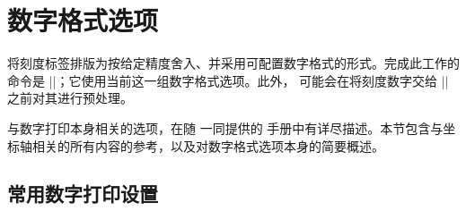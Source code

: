
\section{数字格式选项}
\label{sec:number:printing}

\PGFPlots{} 将刻度标签排版为按给定精度舍入、并采用可配置数字格式的形式。完成此工作的命令是 |\pgfmathprintnumber|；它使用当前这一组数字格式选项。此外，\PGFPlots{} 可能会在将刻度数字交给 |\pgfmathprintnumber| 之前对其进行预处理。

与数字打印本身相关的选项，在随 \PGFPlots{} 一同提供的 \PGFPlotstable{} 手册中有详尽描述。本节包含与坐标轴相关的所有内容的参考，以及对数字格式选项本身的简要概述。


\subsection{常用数字打印设置}
\label{sec:number:faq}

